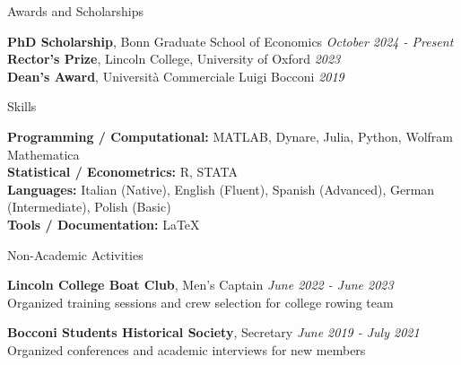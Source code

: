 \documentclass{resume} %
\begin{document}
\begin{rSection}{Awards and Scholarships}

{\bf PhD Scholarship}, Bonn Graduate School of Economics \hfill {\em October 2024 - Present} \\
{\bf Rector's Prize}, Lincoln College, University of Oxford \hfill {\em 2023} \\
{\bf Dean's Award}, Università Commerciale Luigi Bocconi \hfill {\em 2019}

\end{rSection}

\begin{rSection}{Skills}

{\bf Programming / Computational:} MATLAB, Dynare, Julia, Python, Wolfram Mathematica \\
{\bf Statistical / Econometrics:} R, STATA \\
{\bf Languages:} Italian (Native), English (Fluent), Spanish (Advanced), German (Intermediate), Polish (Basic) \\
{\bf Tools / Documentation:} \LaTeX

\end{rSection}

\begin{rSection}{Non-Academic Activities}

{\bf Lincoln College Boat Club}, Men's Captain \hfill {\em June 2022 - June 2023} \\
Organized training sessions and crew selection for college rowing team

{\bf Bocconi Students Historical Society}, Secretary \hfill {\em June 2019 - July 2021} \\
Organized conferences and academic interviews for new members

\end{rSection}
\end{document}
